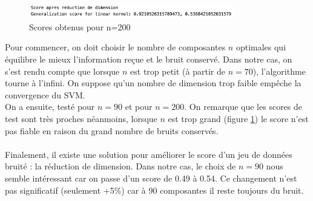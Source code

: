 \documentclass[a4paper,12pt]{article}
\begin{document}
\begin{figure}[H]
    \centering
    \includegraphics[width=0.8\textwidth]{Images/n=200.png}
    \caption{Scores obtenus pour n=200}\label{fig : dim2}
\end{figure}

Pour commencer, on doit choisir le nombre de composantes $n$ optimales qui équilibre le mieux l'information reçue et le bruit conservé.
Dans notre cas, on s'est rendu compte que lorsque $n$ est trop petit (à partir de $n = 70$), l'algorithme tourne à l'infini. On suppose qu'un  nombre de dimension trop faible empêche la convergence du SVM.\\
On a ensuite, testé pour $n = 90$ et pour $n = 200$. On remarque que les scores de test sont très proches néanmoins, lorsque $n$ est trop grand (figure \ref{fig : dim2}) le score n'est pas fiable en raison du grand nombre de bruits conservés.\\
\\
Finalement, il existe une solution pour améliorer le score d'un jeu de données bruité : la réduction de dimension. Dans notre cas, le choix de $n = 90$ nous semble intéressant car on passe d'un score de 0.49 à 0.54.
Ce changement n'est pas significatif (seulement +5\%) car à 90 composantes il reste toujours du bruit.
\end{document}
